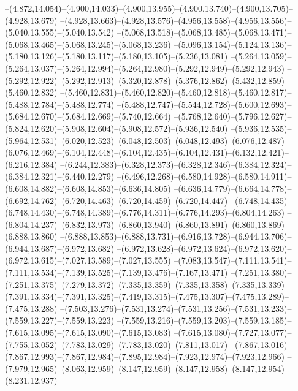   --(4.872,14.054)--(4.900,14.033)--(4.900,13.955)--(4.900,13.740)--(4.900,13.705)--(4.928,13.679)%
  --(4.928,13.663)--(4.928,13.576)--(4.956,13.558)--(4.956,13.556)--(5.040,13.555)--(5.040,13.542)%
  --(5.068,13.518)--(5.068,13.485)--(5.068,13.471)--(5.068,13.465)--(5.068,13.245)--(5.068,13.236)%
  --(5.096,13.154)--(5.124,13.136)--(5.180,13.126)--(5.180,13.117)--(5.180,13.105)--(5.236,13.081)%
  --(5.264,13.059)--(5.264,13.037)--(5.264,12.994)--(5.264,12.980)--(5.292,12.949)--(5.292,12.943)%
  --(5.292,12.922)--(5.292,12.913)--(5.320,12.878)--(5.376,12.862)--(5.432,12.859)--(5.460,12.832)%
  --(5.460,12.831)--(5.460,12.820)--(5.460,12.818)--(5.460,12.817)--(5.488,12.784)--(5.488,12.774)%
  --(5.488,12.747)--(5.544,12.728)--(5.600,12.693)--(5.684,12.670)--(5.684,12.669)--(5.740,12.664)%
  --(5.768,12.640)--(5.796,12.627)--(5.824,12.620)--(5.908,12.604)--(5.908,12.572)--(5.936,12.540)%
  --(5.936,12.535)--(5.964,12.531)--(6.020,12.523)--(6.048,12.503)--(6.048,12.493)--(6.076,12.487)%
  --(6.076,12.469)--(6.104,12.448)--(6.104,12.435)--(6.104,12.431)--(6.132,12.421)--(6.216,12.384)%
  --(6.244,12.383)--(6.328,12.373)--(6.328,12.346)--(6.384,12.324)--(6.384,12.321)--(6.440,12.279)%
  --(6.496,12.268)--(6.580,14.928)--(6.580,14.911)--(6.608,14.882)--(6.608,14.853)--(6.636,14.805)%
  --(6.636,14.779)--(6.664,14.778)--(6.692,14.762)--(6.720,14.463)--(6.720,14.459)--(6.720,14.447)%
  --(6.748,14.435)--(6.748,14.430)--(6.748,14.389)--(6.776,14.311)--(6.776,14.293)--(6.804,14.263)%
  --(6.804,14.237)--(6.832,13.973)--(6.860,13.940)--(6.860,13.891)--(6.860,13.869)--(6.888,13.860)%
  --(6.888,13.853)--(6.888,13.731)--(6.916,13.728)--(6.944,13.706)--(6.944,13.687)--(6.972,13.682)%
  --(6.972,13.628)--(6.972,13.624)--(6.972,13.620)--(6.972,13.615)--(7.027,13.589)--(7.027,13.555)%
  --(7.083,13.547)--(7.111,13.541)--(7.111,13.534)--(7.139,13.525)--(7.139,13.476)--(7.167,13.471)%
  --(7.251,13.380)--(7.251,13.375)--(7.279,13.372)--(7.335,13.359)--(7.335,13.358)--(7.335,13.339)%
  --(7.391,13.334)--(7.391,13.325)--(7.419,13.315)--(7.475,13.307)--(7.475,13.289)--(7.475,13.288)%
  --(7.503,13.276)--(7.531,13.274)--(7.531,13.256)--(7.531,13.233)--(7.559,13.227)--(7.559,13.223)%
  --(7.559,13.216)--(7.559,13.203)--(7.559,13.185)--(7.615,13.095)--(7.615,13.090)--(7.615,13.083)%
  --(7.615,13.080)--(7.727,13.077)--(7.755,13.052)--(7.783,13.029)--(7.783,13.020)--(7.811,13.017)%
  --(7.867,13.016)--(7.867,12.993)--(7.867,12.984)--(7.895,12.984)--(7.923,12.974)--(7.923,12.966)%
  --(7.979,12.965)--(8.063,12.959)--(8.147,12.959)--(8.147,12.958)--(8.147,12.954)--(8.231,12.937)%
